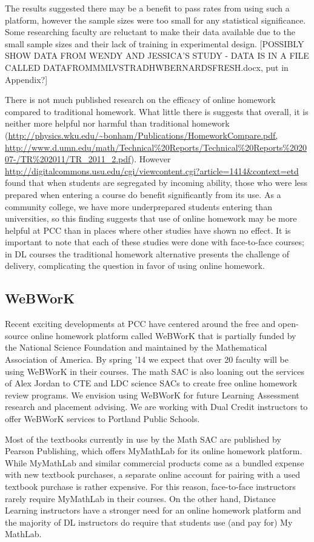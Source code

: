 The results suggested there may be a benefit to pass rates from using such a platform, however the sample sizes were too small for any statistical significance. Some researching faculty are reluctant to make their data available due to the small sample sizes and their lack of training in experimental design. [POSSIBLY SHOW DATA FROM WENDY AND JESSICA'S STUDY - DATA IS IN A FILE CALLED DATAFROMMMLVSTRADHWBERNARDSFRESH.docx, put in Appendix?]

There is not much published research on the efficacy of online homework compared to traditional homework. What little there is suggests that overall, it is neither more helpful nor harmful than traditional homework (\url{http://physics.wku.edu/~bonham/Publications/HomeworkCompare.pdf, http://www.d.umn.edu/math/Technical%20Reports/Technical%20Reports%202007-/TR%202011/TR_2011_2.pdf}). However \url{http://digitalcommons.usu.edu/cgi/viewcontent.cgi?article=1414&context=etd} found that when students are segregated by incoming ability, those who were less prepared when entering a course do benefit significantly from its use. As a community college, we have more underprepared students entering than universities, so this finding suggests that use of online homework may be more helpful at PCC than in places where other studies have shown no effect. It is important to note that each of these studies were done with face-to-face courses; in DL courses the traditional homework alternative presents the challenge of delivery, complicating the question in favor of using online homework.

\subsection{WeBWorK}
Recent exciting developments at PCC have centered around the free and open-source online homework platform called WeBWorK that is partially funded by the National Science Foundation and maintained by the Mathematical Association of America. By spring '14 we expect that over 20 faculty will be using WeBWorK in their courses. The math SAC is also loaning out the services of Alex Jordan to CTE and LDC science SACs to create free online homework review programs. We envision using WeBWorK for future Learning Assessment research and placement advising. We are working with Dual Credit instructors to offer WeBWorK services to Portland Public Schools.

Most of the textbooks currently in use by the Math SAC are published by Pearson Publishing, which offers MyMathLab for its online homework platform. While MyMathLab and similar commercial products come as a bundled expense with new textbook purchases, a separate online account for pairing with a used textbook purchase is rather expensive. For this reason, face-to-face instructors rarely require MyMathLab in their courses. On the other hand, Distance Learning instructors have a stronger need for an online homework platform and the majority of DL instructors do require that students use (and pay for) My MathLab.

